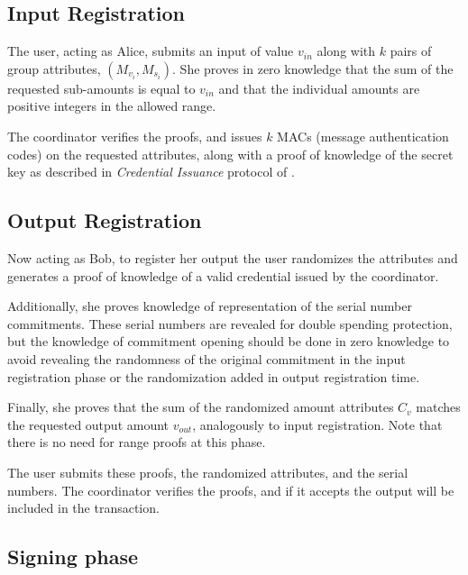 \documentclass{article}
\begin{document}
\subsection{Input Registration} 

The user, acting as Alice, submits an input of value $v_{\mathit{in}}$ along with $k$ pairs of group attributes,
$(M_{v_i}, M_{s_i})$.
She proves in zero knowledge that the sum of the requested sub-amounts is equal to $v_{\mathit{in}}$ and that the individual amounts are positive integers in the allowed range.


The coordinator verifies the proofs, and issues $k$ MACs (message authentication codes) on the requested attributes, along with a proof of knowledge of the secret key as described in \textit{Credential Issuance} protocol of \cite{chase2019signal}.

\subsection{Output Registration}

Now acting as Bob, to register her output the user randomizes the attributes and generates a proof of knowledge of a valid credential issued by the coordinator.

Additionally, she proves knowledge of representation of the serial number commitments. These serial numbers are revealed for double spending protection, but the knowledge of commitment opening should be done in zero knowledge to avoid revealing the randomness of the original commitment in the input registration phase or the randomization added in output registration time.

Finally, she proves that the sum of the randomized amount attributes $C_v$ matches the requested output amount $v_{\mathit{out}}$, analogously to input registration. Note that there is no need for range proofs at this phase.

The user submits these proofs, the randomized attributes, and the serial numbers. The coordinator verifies the proofs, and if it accepts the output will be included in the transaction.

\subsection{Signing phase}
\end{document}
